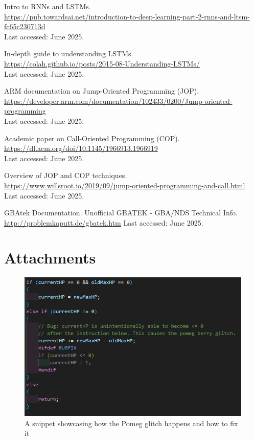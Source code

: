 \documentclass[a4paper]{usiinfbachelorproject}
\begin{document}
\begin{thebibliography}{99}
	Intro to RNNs and LSTMs.\\
	\url{https://pub.towardsai.net/introduction-to-deep-learning-part-2-rnns-and-ltsm-fc65c230713d}\\
	Last accessed: June 2025.


	In-depth guide to understanding LSTMs.\\
	\url{https://colah.github.io/posts/2015-08-Understanding-LSTMs/}\\
	Last accessed: June 2025.


	ARM documentation on Jump-Oriented Programming (JOP).\\
	\url{https://developer.arm.com/documentation/102433/0200/Jump-oriented-programming}\\
	Last accessed: June 2025.


	Academic paper on Call-Oriented Programming (COP).\\
	\url{https://dl.acm.org/doi/10.1145/1966913.1966919}\\
	Last accessed: June 2025.


	Overview of JOP and COP techniques.\\
	\url{https://www.willsroot.io/2019/09/jump-oriented-programming-and-call.html}\\
	Last accessed: June 2025.

	GBAtek Documentation.
	Unofficial GBATEK - GBA/NDS Technical Info.
	\url{http://problemkaputt.de/gbatek.htm}
	Last accessed: June 2025.


\end{thebibliography}

\newpage
\section{Attachments}
\FloatBarrier

\begin{figure}[htbp]
	\centering
	\includegraphics{figures/pomeg_glitch.png}
	\caption{A snippet showcasing how the Pomeg glitch happens and how to fix it}
	\label{fig:pomeg_glitch_code}
\end{figure}
\end{document}
